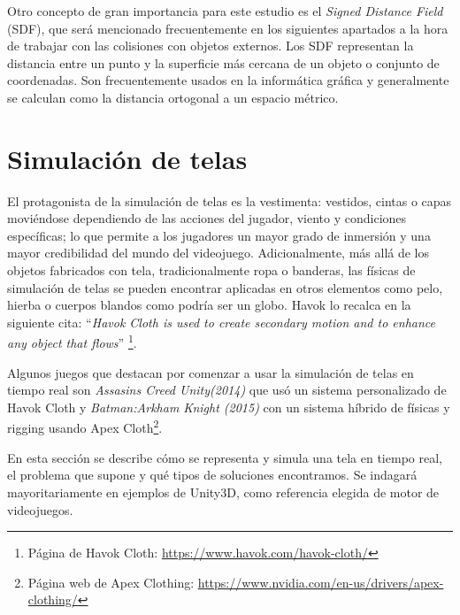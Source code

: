 Otro concepto de gran importancia para este estudio es el \textit{Signed Distance Field} (SDF), que será mencionado frecuentemente en los siguientes apartados a la hora de trabajar con las colisiones con objetos externos. Los SDF representan la distancia entre un punto y la superficie más cercana de un objeto o conjunto de coordenadas. Son frecuentemente usados en la informática gráfica y generalmente se calculan como la distancia ortogonal a un espacio métrico.


\section{Simulación de telas}
El protagonista de la simulación de telas es la vestimenta: vestidos, cintas o capas moviéndose dependiendo de las acciones del jugador, viento y condiciones específicas; lo que permite a los jugadores un mayor grado de inmersión y una mayor credibilidad del mundo del videojuego. Adicionalmente, más allá de los objetos fabricados con tela, tradicionalmente ropa o banderas, las físicas de simulación de telas se pueden encontrar aplicadas en otros elementos como pelo, hierba o cuerpos blandos como podría ser un globo. Havok lo recalca en la siguiente cita: ``\textit{Havok Cloth is used to create secondary motion and to enhance any object that flows}'' \footnote{Página de Havok Cloth: \url{https://www.havok.com/havok-cloth/}}. \newline

Algunos juegos que destacan por comenzar a usar la simulación de telas en tiempo real son \textit{Assasins Creed Unity(2014)} \cite{acunity} que usó un sistema personalizado de Havok Cloth y \textit{Batman:Arkham Knight (2015)} \cite{batmanarkham} con un sistema híbrido de físicas y rigging usando Apex Cloth\footnote{Página web de Apex Clothing: \url{https://www.nvidia.com/en-us/drivers/apex-clothing/}}.

En esta sección se describe cómo se representa y simula una tela en tiempo real, el problema que supone y qué tipos de soluciones encontramos. Se indagará mayoritariamente en ejemplos de Unity3D, como referencia elegida de motor de videojuegos. 

